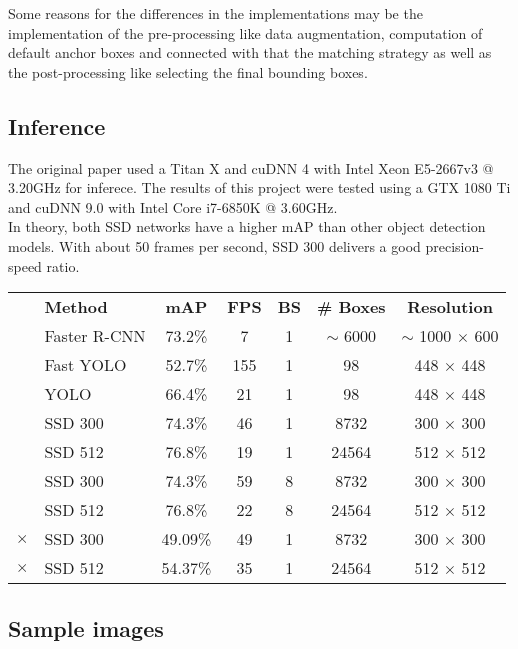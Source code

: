 Some reasons for the differences in the implementations may be the implementation of the pre-processing like data augmentation, computation of default anchor boxes and connected with that the matching strategy as well as the post-processing like selecting the final bounding boxes.

\subsection{Inference}

The original paper used a Titan X and cuDNN 4 with Intel Xeon E5-2667v3 @ 3.20GHz for inferece. The results of this project were tested using a GTX 1080 Ti and cuDNN 9.0 with Intel Core i7-6850K @ 3.60GHz. \\

In theory, both SSD networks have a higher mAP than other object detection models. With about 50 frames per second, SSD 300 delivers a good precision-speed ratio.

\begin{center}
  \begin{tabular}{rl|c|c|c|c|c}
    & \textbf{Method} & \textbf{mAP} & \textbf{FPS} & \textbf{BS} & \textbf{\# Boxes} & \textbf{Resolution} \\ \cline{2-7}
    & Faster R-CNN & 73.2\% & 7 & 1 & $\sim$ 6000 & $\sim$ 1000 $\times$ 600 \\ \cline{2-7}
    & Fast YOLO & 52.7\% & 155 & 1 & 98 & 448 $\times$ 448 \\
    & YOLO & 66.4\% & 21 & 1 & 98 & 448 $\times$ 448 \\ \cline{2-7}
    & SSD 300 & 74.3\% & 46 & 1 & 8732 & 300 $\times$ 300 \\
    & SSD 512 & 76.8\% & 19 & 1 & 24564 & 512 $\times$ 512 \\
    & SSD 300 & 74.3\% & 59 & 8 & 8732 & 300 $\times$ 300 \\
    & SSD 512 & 76.8\% & 22 & 8 & 24564 & 512 $\times$ 512 \\ \cline{2-7}
    $\times$ & SSD 300 & 49.09\% & 49 & 1 & 8732 & 300 $\times$ 300 \\
    $\times$ & SSD 512 & 54.37\% & 35 & 1 & 24564 & 512 $\times$ 512
  \end{tabular}
\end{center}

\subsection{Sample images}

